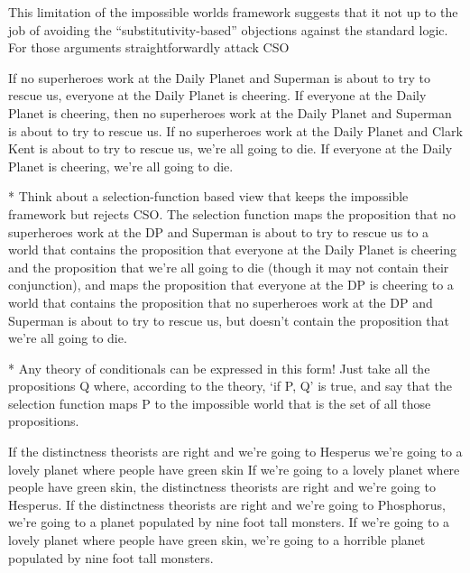 \documentclass[If.tex]{subfiles}
\begin{document}



This limitation of the impossible worlds framework suggests that it not up to the job of avoiding the “substitutivity-based” objections against the standard logic.  For those arguments straightforwardly attack CSO 

\begin{prop}
	\nitem
	\begin{prop}
		\aitem
		If no superheroes work at the Daily Planet and Superman is about to try to rescue us, everyone at the Daily Planet is cheering.
		\aitem
		If everyone at the Daily Planet is cheering, then no superheroes work at the Daily Planet and Superman is about to try to rescue us.  
		\aitem
		If no superheroes work at the Daily Planet and Clark Kent is about to try to rescue us, we're all going to die. 
		\aitem
		If everyone at the Daily Planet is cheering, we're all going to die.	
	\end{prop}
\end{prop}

* Think about a selection-function based view that keeps the impossible framework but rejects CSO.  The selection function maps the proposition that no superheroes work at the DP and Superman is about to try to rescue us to a world that contains the proposition that everyone at the Daily Planet is cheering and the proposition that we're all going to die (though it may not contain their conjunction), and maps the proposition that everyone at the DP is cheering to a world that contains the proposition that no superheroes work at the DP and Superman is about to try to rescue us, but doesn't contain the proposition that we're all going to die.  

* Any theory of conditionals can be expressed in this form!  Just take all the propositions Q where, according to the theory, ‘if P, Q’ is true, and say that the selection function maps P to the impossible world that is the set of all those propositions.  
		

\begin{prop}
	\nitem
	\begin{prop}
		\aitem
		If the distinctness theorists are right and we're going to Hesperus we're going to a lovely planet where people have green skin
		\aitem
		If we're going to a lovely planet where people have green skin, the distinctness theorists are right and we're going to Hesperus.
		\aitem
		If the distinctness theorists are right and we're going to Phosphorus, we're going to a planet populated by nine foot tall monsters.
		\aitem
		If we're going to a lovely planet where people have green skin, we're going to a horrible planet populated by nine foot tall monsters.
	\end{prop}
\end{prop}
\end{document}
